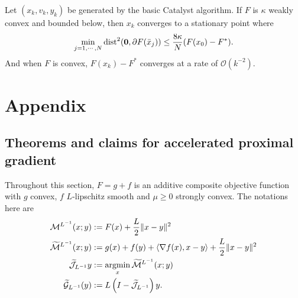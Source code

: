 \documentclass[12pt]{article}
\begin{document}
    \begin{theorem}\label{thm:basic-4wd-catalyst}
        Let $(x_k, v_k, y_k)$ be generated by the basic Catalyst algorithm. 
        If $F$ is $\kappa$ weakly convex and bounded below, then $x_k$ converges to a stationary point where
        \begin{align*}
            \min_{j = 1, \cdots, N} \operatorname{dist}^2(\mathbf 0, \partial F(\bar x_j))
            \le \frac{8 \kappa}{N}(F(x_0) - F^*). 
        \end{align*}
        And when $F$ is convex, $F(x_k) - F^*$ converges at a rate of $\mathcal O(k^{-2})$. 
    \end{theorem}
    \begin{remark}
        
    \end{remark}





\newpage

\appendix
\section{Appendix}

\subsection{Theorems and claims for accelerated proximal gradient}\label{app:sec:thm-claim-acc-prox-grad}
    Throughout this section, $F = g + f$ is an additive composite objective function with $g$ convex, $f$ $L$-lipschitz smooth and $\mu \ge0$ strongly convex. 
    The notations here are 
    \begin{align*}
        \mathcal M^{L^{-1}}(x; y) 
        &:= 
        F(x) + \frac{L}{2}\Vert x - y\Vert^2
        \\
        \widetilde{ \mathcal M}^{L^{-1}}(x; y) 
        &:= g(x) + f(y) 
        + 
        \left\langle \nabla f(x), x - y\right\rangle 
        + 
        \frac{L}{2}\Vert x - y\Vert^2
        \\
        \widetilde{\mathcal J}_{L^{-1}}y 
        &:= \mathop{\rm argmin}\limits_{x} \widetilde{\mathcal M}^{L^{-1}}(x; y)
        \\
        \widetilde{\mathcal G}_{L^{-1}}(y)
        &:= L\left(I - \widetilde{\mathcal J}_{L^{-1}}\right)y. 
    \end{align*}
\end{document}
